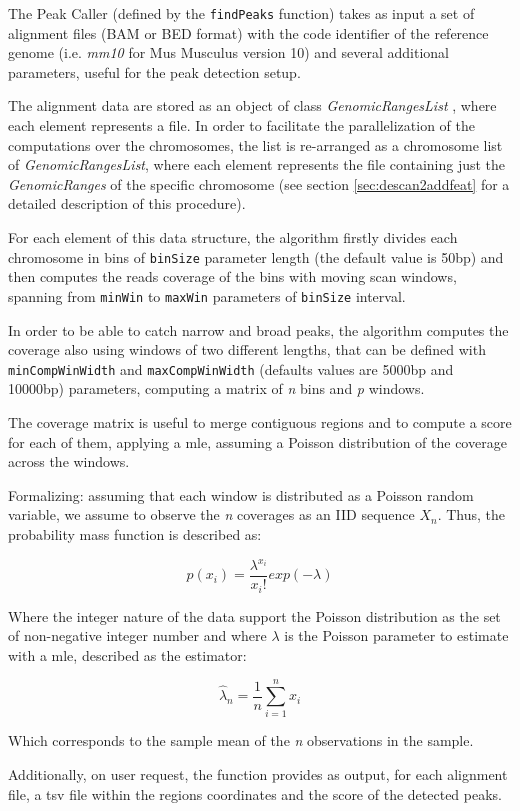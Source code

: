 The Peak Caller (defined by the \lstinline!findPeaks! function) takes as input a set of alignment files (BAM \cite{Li2009} or BED format) with the code identifier of the reference genome (i.e. \textit{mm10} for Mus Musculus version 10) and several additional parameters, useful for the peak detection setup.

The alignment data are stored as an object of class \textit{GenomicRangesList} \cite{Lawrence2013}, where each element represents a file. 
In order to facilitate the parallelization of the computations over the chromosomes, the list is re-arranged as a chromosome list of \textit{GenomicRangesList}, where each element represents the file containing just the \textit{GenomicRanges} of the specific chromosome (see section \ref{sec:descan2addfeat} for a detailed description of this procedure).

For each element of this data structure, the algorithm firstly divides each chromosome in bins of \lstinline!binSize! parameter length (the default value is 50bp) and then computes the reads coverage of the bins with moving scan windows, spanning from \lstinline!minWin! to \lstinline!maxWin! parameters of \lstinline!binSize! interval.

In order to be able to catch narrow and broad peaks, the algorithm computes the coverage also using windows of two different lengths, that can be defined with \lstinline!minCompWinWidth! and \lstinline!maxCompWinWidth! (defaults values are 5000bp and 10000bp) parameters, computing a matrix of \textit{n} bins and \textit{p} windows.

The coverage matrix is useful to merge contiguous regions and to compute a score for each of them, applying a \gls{mle}, assuming a Poisson distribution of the coverage across the windows.

Formalizing: assuming that each window is distributed as a Poisson random variable, we assume to observe the \textit{n} coverages as an IID sequence $X_n$. Thus, the probability mass function is described as:

\[ p(x_i) = \frac{\lambda^{x_i}}{{x_i!}} exp(-\lambda)\]

Where the integer nature of the data support the Poisson distribution as the set of non-negative integer number and where $\lambda$ is the Poisson parameter to estimate with a \gls{mle}, described as the estimator:

\[\hat{\lambda}_n=\frac{1}{n}\sum_{i=1}^{n}x_i\]

Which corresponds to the sample mean of the \textit{n} observations in the sample.



Additionally, on user request, the function provides as output, for each alignment file, a \gls{tsv} file within the regions coordinates and the score of the detected peaks.


